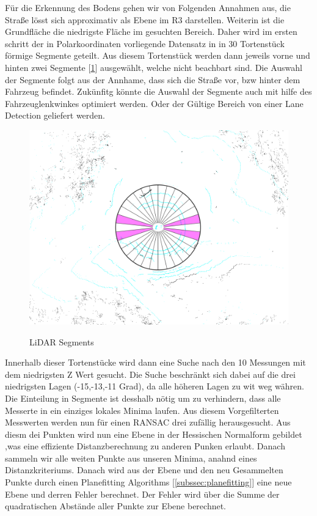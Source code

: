 \documentclass[11pt,oneside,openright]{mpreport}
\begin{document}
Für die Erkennung des Bodens gehen wir von Folgenden Annahmen aus, die Straße lösst sich approximativ als Ebene im R3 darstellen. Weiterin ist die Grundfläche die niedrigste
Fläche im gesuchten Bereich. Daher wird im ersten schritt der in Polarkoordinaten vorliegende Datensatz in  in 30 Tortenstück förmige Segmente geteilt.
Aus diesem Tortenstück werden dann jeweils vorne und hinten zwei Segmente [\cref{segments}] ausgewählt, welche nicht beachbart sind. Die Auswahl der Segmente folgt aus der Annhame,
dass sich die Straße vor, bzw hinter dem Fahrzeug befindet. Zukünfitg könnte die Auswahl der Segmente auch mit hilfe des Fahrzeuglenkwinkes optimiert werden. Oder der Gültige Bereich
von einer Lane Detection geliefert werden.

\begin{figure}[!ht]
\caption{LiDAR Segments}
\includegraphics[width=\textwidth]{bilder/segments.png}
\label{segments}
\end{figure}

Innerhalb dieser Tortenstücke wird dann eine Suche nach den 10 Messungen mit dem niedrigsten Z Wert gesucht. Die Suche beschränkt sich dabei auf die drei niedrigsten Lagen (-15,-13,-11 Grad),
da alle höheren Lagen zu wit weg währen. Die Einteilung in Segmente ist desshalb nötig um zu verhindern, dass alle Messerte in ein einziges lokales Minima laufen.
Aus diesem Vorgefilterten Messwerten werden nun für einen \ac{RANSAC} drei zufällig herausgesucht.
Aus diesm dei Punkten wird nun eine Ebene in der Hessischen Normalform gebildet ,was eine effiziente Distanzberechnung zu anderen Punken erlaubt. Danach sammeln wir alle weiten Punkte aus unseren Minima, anahnd eines Distanzkriteriums.
Danach wird aus der Ebene und den neu Gesammelten Punkte durch einen Planefitting Algorithms [\cref{subssec:planefitting}] eine neue Ebene und derren Fehler berechnet.
Der Fehler wird über die Summe der quadratischen Abstände aller Punkte zur Ebene berechnet.
\end{document}
